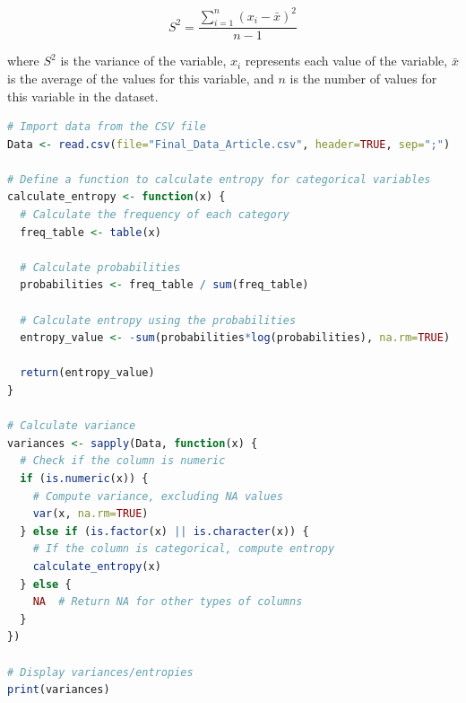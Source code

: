\begin{equation}\label{variance}
    S^2 = \frac{\sum_{i=1}^{n} (x_i - \bar{x})^2}{n-1}
\end{equation}

where $S^2$ is the variance of the variable, $x_i$ represents each value of the variable, $\bar{x}$ is the average of the values for this variable, and $n$ is the number of values for this variable in the dataset.

\begin{lstlisting}[label=lst:variance,language=R,caption=RStudio script to calculate the variance of each numerical and categorical variables in the final dataset.]
# Import data from the CSV file
Data <- read.csv(file="Final_Data_Article.csv", header=TRUE, sep=";")

# Define a function to calculate entropy for categorical variables
calculate_entropy <- function(x) {
  # Calculate the frequency of each category
  freq_table <- table(x)

  # Calculate probabilities
  probabilities <- freq_table / sum(freq_table)

  # Calculate entropy using the probabilities
  entropy_value <- -sum(probabilities*log(probabilities), na.rm=TRUE)

  return(entropy_value)
}

# Calculate variance
variances <- sapply(Data, function(x) {
  # Check if the column is numeric
  if (is.numeric(x)) {
    # Compute variance, excluding NA values
    var(x, na.rm=TRUE)
  } else if (is.factor(x) || is.character(x)) {
    # If the column is categorical, compute entropy
    calculate_entropy(x)
  } else {
    NA  # Return NA for other types of columns
  }
})

# Display variances/entropies
print(variances)
\end{lstlisting}

